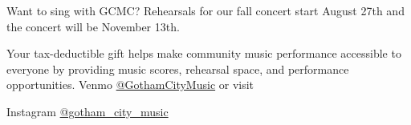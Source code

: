 \documentclass{article}[10pt]
\begin{document}
\begin{center}
\begin{minipage}{95mm}
\begin{center}
                \vspace{1mm}

                \begin{small}
                    Want to sing with GCMC? Rehearsals for our fall concert start August 27th and the concert will be November 13th.
                \end{small}


            \end{center}

            \vspace{2mm}

            \begin{center}
                {\textbf{}}
            \end{center}
            \vspace{-3mm}
            \begin{footnotesize}
                Your tax-deductible gift helps make community music performance accessible to everyone by providing music scores, rehearsal space, and performance opportunities.
                Venmo \href{https://account.venmo.com/u/GothamCityMusic}{@GothamCityMusic} or visit \textbf{}
            \end{footnotesize}

            \vspace{6mm}

            \begin{center}
                {\textbf{}}

                            \vspace{1mm}

                \faInstagram{}{}  Instagram  \href{https://www.instagram.com/gotham_city_music/}{@gotham\_city\_music}
            \end{center}


        \end{minipage}

    \end{center}
\end{document}
